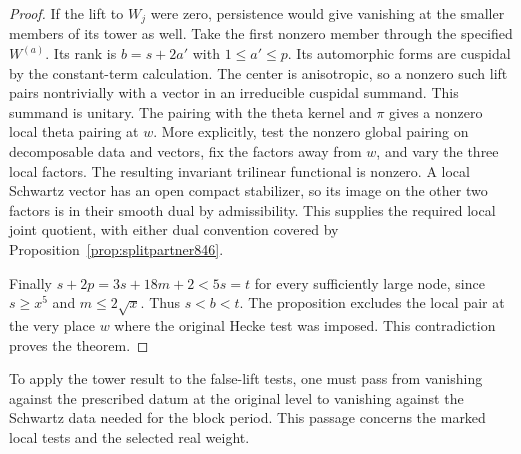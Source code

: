 \documentclass[a4paper,11pt]{article}
\theoremstyle{definition}
\theoremstyle{remark}
\numberwithin{equation}{section}
\begin{document}
\begin{proof}
If the lift to \(W_j\) were zero, persistence would give vanishing
at the smaller members of its tower as well. Take the first
nonzero member through the specified \(W^{(a)}\). Its rank is
\(b=s+2a'\) with \(1\le a'\le p\). Its automorphic forms are
cuspidal by the constant-term calculation. The center is
anisotropic, so a nonzero such lift pairs nontrivially with a
vector in an irreducible cuspidal summand. This summand is
unitary. The pairing with the theta kernel and \(\pi\) gives a
nonzero local theta pairing at \(w\). More explicitly, test the
nonzero global pairing on decomposable data and vectors, fix
the factors away from \(w\), and vary the three local factors.
The resulting invariant trilinear functional is nonzero. A local
Schwartz vector has an open compact stabilizer, so its image on
the other two factors is in their smooth dual by admissibility.
This supplies the required local joint quotient, with either
dual convention covered by Proposition~\ref{prop:splitpartner846}.

Finally \(s+2p=3s+18m+2<5s=t\) for every sufficiently large
node, since \(s\ge x^5\) and \(m\le2\sqrt x\).
Thus \(s<b<t\). The proposition excludes the local pair at the
very place \(w\) where the original Hecke test was imposed.
This contradiction proves the theorem.
\end{proof}

To apply the tower result to the false-lift tests, one must pass
from vanishing against the prescribed datum at the original level
to vanishing against the Schwartz data needed for the block
period. This passage concerns the marked local tests and the
selected real weight.
\clearpage
\end{document}
